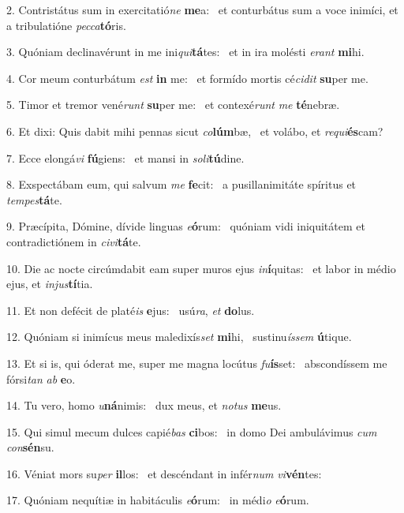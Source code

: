 2. Contristátus sum in exercitatió\textit{ne} \textbf{me}a: \ast\  et conturbátus sum a voce inimíci, et a tribulatióne \textit{pec}\textit{ca}\textbf{tó}ris.\

3. Quóniam declinavérunt in me ini\textit{qui}\textbf{tá}tes: \ast\  et in ira molésti \textit{e}\textit{rant} \textbf{mi}hi.\

4. Cor meum conturbátum \textit{est} \textbf{in} me: \ast\  et formído mortis cé\textit{ci}\textit{dit} \textbf{su}per me.\

5. Timor et tremor vené\textit{runt} \textbf{su}per me: \ast\  et contexé\textit{runt} \textit{me} \textbf{té}nebræ.\

6. Et dixi: Quis dabit mihi pennas sicut \textit{co}\textbf{lúm}bæ, \ast\  et volábo, et \textit{re}\textit{qui}\textbf{és}cam?\

7. Ecce elongá\textit{vi} \textbf{fú}giens: \ast\  et mansi in \textit{so}\textit{li}\textbf{tú}dine.\

8. Exspectábam eum, qui salvum \textit{me} \textbf{fe}cit: \ast\  a pusillanimitáte spíritus et \textit{tem}\textit{pes}\textbf{tá}te.\

9. Præcípita, Dómine, dívide linguas \textit{e}\textbf{ó}rum: \ast\  quóniam vidi iniquitátem et contradictiónem in \textit{ci}\textit{vi}\textbf{tá}te.\

10. Die ac nocte circúmdabit eam super muros ejus \textit{in}\textbf{í}quitas: \ast\  et labor in médio ejus, et \textit{in}\textit{jus}\textbf{tí}tia.\

11. Et non defécit de platé\textit{is} \textbf{e}jus: \ast\  usú\textit{ra}, \textit{et} \textbf{do}lus.\

12. Quóniam si inimícus meus maledixís\textit{set} \textbf{mi}hi, \ast\  sustinu\textit{ís}\textit{sem} \textbf{ú}tique.\

13. Et si is, qui óderat me, super me magna locútus \textit{fu}\textbf{ís}set: \ast\  abscondíssem me fórsi\textit{tan} \textit{ab} \textbf{e}o.\

14. Tu vero, homo \textit{u}\textbf{ná}nimis: \ast\  dux meus, et \textit{no}\textit{tus} \textbf{me}us.\

15. Qui simul mecum dulces capié\textit{bas} \textbf{ci}bos: \ast\  in domo Dei ambulávimus \textit{cum} \textit{con}\textbf{sén}su.\

16. Véniat mors su\textit{per} \textbf{il}los: \ast\  et descéndant in infér\textit{num} \textit{vi}\textbf{vén}tes:\

17. Quóniam nequítiæ in habitáculis \textit{e}\textbf{ó}rum: \ast\  in médi\textit{o} \textit{e}\textbf{ó}rum.\

